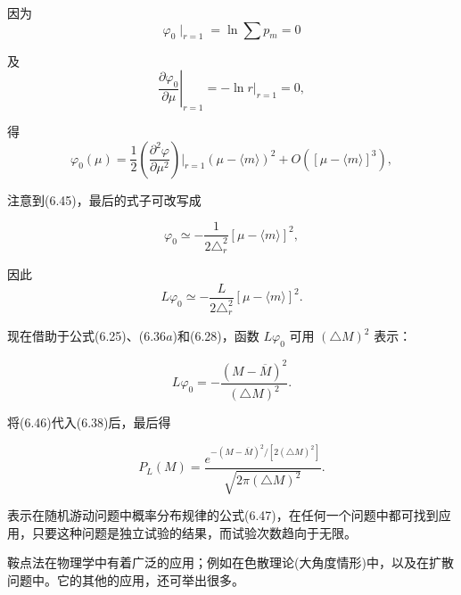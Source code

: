 因为
\begin{equation*}
\varphi_ {0} \mid_ {r = 1} = \ln \sum p _ {m} = 0
\end{equation*}

及
\begin{equation*}
\left. \frac {\partial \varphi_ {0}}{\partial \mu} \right| _ {r = 1} = - \ln r \Big | _ {r = 1} = 0,
\end{equation*}

得
\begin{equation*}
\varphi_ {0} (\mu) = \frac {1}{2} \left(\frac {\partial^ {2} \varphi}{\partial \mu^ {2}}\right) \Bigg | _ {r = 1} (\mu - \langle m \rangle) ^ {2} + O ([ \mu - \langle m \rangle ] ^ {3}),
\end{equation*}

注意到(6.45)，最后的式子可改写成

\begin{equation*}
\varphi_ {0} \simeq - \frac {1}{2 \triangle_ {r} ^ {2}} [ \mu - \langle m \rangle ] ^ {2},
\end{equation*}

因此
\begin{equation*}
L \varphi_ {0} \simeq - \frac {L}{2 \triangle_ {r} ^ {2}} [ \mu - \langle m \rangle ] ^ {2}.
\end{equation*}

现在借助于公式(6.25)、(6.36$a$)和(6.28)，函数 $L\varphi_{0}$ 可用 $(\triangle M)^{2}$ 表示：

\begin{equation*}
L \varphi_ {0} = - \frac {(M - \overline {{M}}) ^ {2}}{(\triangle M) ^ {2}}.\tag{6.46}
\end{equation*}

将(6.46)代入(6.38)后，最后得

\begin{equation*}
P _ {L} (M) = \frac {e ^ {- (M - \overline {{{M}}}) ^ {2} / [2 (\triangle M) ^ {2}]}}{\sqrt {2 \pi (\triangle M) ^ {2}}}.\tag{6.47}
\end{equation*}

表示在随机游动问题中概率分布规律的公式(6.47)，在任何一个问题中都可找到应用，只要这种问题是独立试验的结果，而试验次数趋向于无限。

鞍点法在物理学中有着广泛的应用；例如在色散理论(大角度情形)中，以及在扩散问题中。它的其他的应用，还可举出很多。
